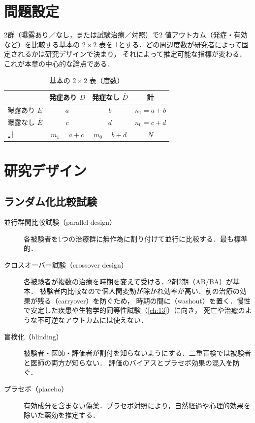 \section{問題設定}\label{sec:02-setting}
2群（曝露あり／なし，または試験治療／対照）で2 値アウトカム（発症・有効など）を比較する基本の $2\times2$ 表を
\cref{tab:02-2x2}とする．どの周辺度数が研究者によって固定されるかは研究デザインで決まり，
それによって推定可能な指標が変わる．これが本章の中心的な論点である．
\begin{table}[htbp]
\centering\small
\caption{基本の $2\times2$ 表（度数）}\label{tab:02-2x2}
\begin{tabular}{@{}lccc@{}}
\toprule
 & 発症あり $D$ & 発症なし $\bar D$ & 計\\
\midrule
曝露あり $E$ & $a$ & $b$ & $n_1=a+b$\\
曝露なし $\bar E$ & $c$ & $d$ & $n_0=c+d$\\
\midrule
計 & $m_1=a+c$ & $m_0=b+d$ & $N$\\
\bottomrule
\end{tabular}
\end{table}

\section{研究デザイン}\label{sec:02-design}
\subsection{ランダム化比較試験}\label{subsec:02-rct}
\begin{description}
\item[並行群間比較試験（parallel design）] 各被験者を1つの治療群に無作為に割り付けて並行に比較する．最も標準的．
\item[クロスオーバー試験（crossover design）] 各被験者が複数の治療を時期を変えて受ける．2剤2期（AB/BA）が基本．
      被験者内比較なので個人間変動が除かれ効率が高い．前の治療の効果が残る（carryover）を防ぐため，
      時期の間に（washout）を置く．慢性で安定した疾患や生物学的同等性試験（\cref{ch:13}）に向き，
      死亡や治癒のような不可逆なアウトカムには使えない．
\item[盲検化（blinding）] 被験者・医師・評価者が割付を知らないようにする．二重盲検では被験者と医師の両方が知らない．
      評価のバイアスとプラセボ効果の混入を防ぐ．
\item[プラセボ（placebo）] 有効成分を含まない偽薬．プラセボ対照により，自然経過や心理的効果を除いた薬効を推定する．
\end{description}

